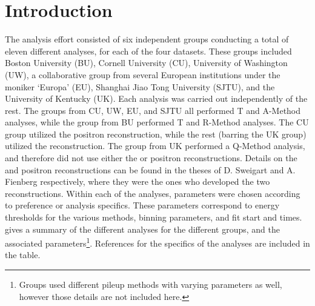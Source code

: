 
\graphicspath{{Body/Figures/}}

\clearpage
\section{Introduction}


The \Rone \wa analysis effort consisted of six independent groups conducting a total of eleven different analyses, for each of the four \Rone datasets. These groups included Boston University (BU), Cornell University (CU), University of Washington (UW), a collaborative group from several European institutions under the moniker `Europa' (EU), Shanghai Jiao Tong University (SJTU), and the University of Kentucky (UK). Each analysis was carried out independently of the rest. The groups from CU, UW, EU, and SJTU all performed T and A-Method analyses, while the group from BU performed T and R-Method analyses. The CU group utilized the \RE positron reconstruction, while the rest (barring the UK group) utilized the \RW reconstruction. The group from UK performed a Q-Method analysis, and therefore did not use either the \RE or \RW positron reconstructions. Details on the \RE and \RW positron reconstructions can be found in the theses of D. Sweigart \cite{phdthesis:2020Sweigart} and A. Fienberg \cite{phdthesis:2019Fienberg} respectively, where they were the ones who developed the two reconstructions. Within each of the analyses, parameters were chosen according to preference or analysis specifics. These parameters correspond to energy thresholds for the various methods, binning parameters, and fit start and times.  gives a summary of the different analyses for the different groups, and the associated parameters\footnote{Groups used different pileup methods with varying parameters as well, however those details are not included here.}. References for the specifics of the analyses are included in the table.


